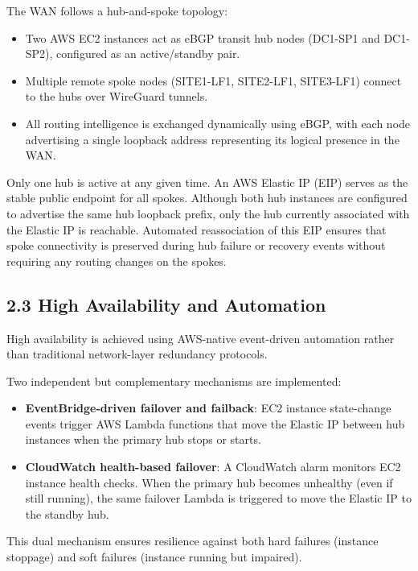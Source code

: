 \documentclass[11pt]{article}
\begin{document}
The WAN follows a hub-and-spoke topology:

\begin{itemize}
  \item Two AWS EC2 instances act as eBGP transit hub nodes (DC1-SP1 and DC1-SP2), configured as an active/standby pair.
  \item Multiple remote spoke nodes (SITE1-LF1, SITE2-LF1, SITE3-LF1) connect to the hubs over WireGuard tunnels.
  \item All routing intelligence is exchanged dynamically using eBGP, with each node advertising a single loopback address representing its logical presence in the WAN.
\end{itemize}

Only one hub is active at any given time. An AWS Elastic IP (EIP) serves as the stable public endpoint for all spokes. Although both hub instances are configured to advertise the same hub loopback prefix, only the hub currently associated with the Elastic IP is reachable. Automated reassociation of this EIP ensures that spoke connectivity is preserved during hub failure or recovery events without requiring any routing changes on the spokes.

\subsection{2.3 High Availability and Automation}
\label{sec:ha-summary}

High availability is achieved using AWS-native event-driven automation rather than traditional network-layer redundancy protocols.

Two independent but complementary mechanisms are implemented:

\begin{itemize}
  \item \textbf{EventBridge-driven failover and failback}:  
  EC2 instance state-change events trigger AWS Lambda functions that move the Elastic IP between hub instances when the primary hub stops or starts.
  \item \textbf{CloudWatch health-based failover}:  
  A CloudWatch alarm monitors EC2 instance health checks. When the primary hub becomes unhealthy (even if still running), the same failover Lambda is triggered to move the Elastic IP to the standby hub.
\end{itemize}

This dual mechanism ensures resilience against both hard failures (instance stoppage) and soft failures (instance running but impaired).
\end{document}

